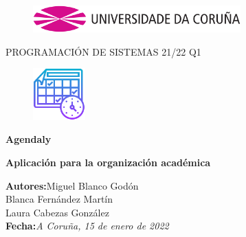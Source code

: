 \documentclass[a4paper,openright,12pt]{article}
\begin{document}
\begin{titlepage}

\begin{center}
\vspace*{-1in}
\begin{figure}[htb]
\begin{center}
\includegraphics[width=8cm]{udc.eps}
\end{center}
\end{figure}

\vspace*{1in}
PROGRAMACIÓN DE SISTEMAS 21/22 Q1\\


\begin{figure}[htb]
\begin{center}
\includegraphics[width=2cm]{icono.png}
\end{center}
\end{figure}
\begin{Large}
\textbf{Agendaly} \\
\end{Large}
\begin{Med}
\textbf{Aplicación para la organización académica} \\
\end{Med}

\vspace*{3in}

\begin{large}
\raggedleft
\textbf{Autores:}Miguel Blanco Godón \\
Blanca Fernández Martín\\
Laura Cabezas González\\
\textbf{Fecha:}\textit{A Coruña, 15 de enero de 2022}\\
\end{large}

\end{center}
\end{titlepage} 

\newpage

\end{document}

